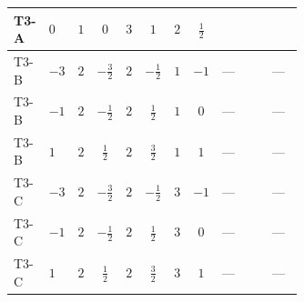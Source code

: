 \documentclass[8pt]{article}
\begin{document}
\begin{landscape}
\begin{longtable}{@{}llcccccc >{\raggedright\arraybackslash}p{0.21\linewidth} >{\raggedright\arraybackslash}p{0.21\linewidth} >{\raggedright\arraybackslash}p{0.21\linewidth}@{}}
\midrule
T3-A & $0$ & $1$ & $0$ & $3$ & $1$ & $2$ & $\frac{1}{2}$ & \scriptsize\adjustbox{max width=\linewidth}{$\begin{gathered} +\frac{3 {\lambda_{HS_2}^{(A)}}^2}{2}\end{gathered}$} & \scriptsize\adjustbox{max width=\linewidth}{$\begin{gathered} +14 {\lambda_{S_2}^{(1)}}^2\end{gathered}$} & \scriptsize\adjustbox{max width=\linewidth}{$\begin{gathered} +26 {\lambda_{S_2}^{(A)}}^2\end{gathered}$} \\
\midrule
T3-B & $-3$ & $2$ & $-\frac{3}{2}$ & $2$ & $-\frac{1}{2}$ & $1$ & $-1$ & --- & \scriptsize\adjustbox{max width=\linewidth}{$\begin{gathered} +12 {\lambda_{S_2}^{(1)}}^2\end{gathered}$} & --- \\
\midrule
T3-B & $-1$ & $2$ & $-\frac{1}{2}$ & $2$ & $\frac{1}{2}$ & $1$ & $0$ & --- & \scriptsize\adjustbox{max width=\linewidth}{$\begin{gathered} +12 {\lambda_{S_2}^{(1)}}^2\end{gathered}$} & --- \\
\midrule
T3-B & $1$ & $2$ & $\frac{1}{2}$ & $2$ & $\frac{3}{2}$ & $1$ & $1$ & --- & \scriptsize\adjustbox{max width=\linewidth}{$\begin{gathered} +12 {\lambda_{S_2}^{(1)}}^2\end{gathered}$} & --- \\
\midrule
T3-C & $-3$ & $2$ & $-\frac{3}{2}$ & $2$ & $-\frac{1}{2}$ & $3$ & $-1$ & --- & \scriptsize\adjustbox{max width=\linewidth}{$\begin{gathered} +12 {\lambda_{S_2}^{(1)}}^2\end{gathered}$} & --- \\
\midrule
T3-C & $-1$ & $2$ & $-\frac{1}{2}$ & $2$ & $\frac{1}{2}$ & $3$ & $0$ & --- & \scriptsize\adjustbox{max width=\linewidth}{$\begin{gathered} +12 {\lambda_{S_2}^{(1)}}^2\end{gathered}$} & --- \\
\midrule
T3-C & $1$ & $2$ & $\frac{1}{2}$ & $2$ & $\frac{3}{2}$ & $3$ & $1$ & --- & \scriptsize\adjustbox{max width=\linewidth}{$\begin{gathered} +12 {\lambda_{S_2}^{(1)}}^2\end{gathered}$} & --- \\

\end{longtable}
\end{landscape}
\end{document}
